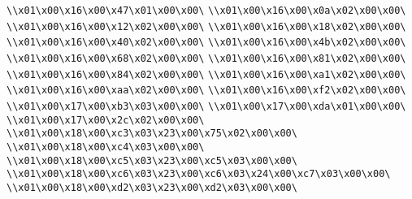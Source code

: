\verb|\\x01\x00\x16\x00\x47\x01\x00\x00\|\newline
\verb|\\x01\x00\x16\x00\x0a\x02\x00\x00\|\newline
\verb|\\x01\x00\x16\x00\x12\x02\x00\x00\|\newline
\verb|\\x01\x00\x16\x00\x18\x02\x00\x00\|\newline
\verb|\\x01\x00\x16\x00\x40\x02\x00\x00\|\newline
\verb|\\x01\x00\x16\x00\x4b\x02\x00\x00\|\newline
\verb|\\x01\x00\x16\x00\x68\x02\x00\x00\|\newline
\verb|\\x01\x00\x16\x00\x81\x02\x00\x00\|\newline
\verb|\\x01\x00\x16\x00\x84\x02\x00\x00\|\newline
\verb|\\x01\x00\x16\x00\xa1\x02\x00\x00\|\newline
\verb|\\x01\x00\x16\x00\xaa\x02\x00\x00\|\newline
\verb|\\x01\x00\x16\x00\xf2\x02\x00\x00\|\newline
\verb|\\x01\x00\x17\x00\xb3\x03\x00\x00\|\newline
\verb|\\x01\x00\x17\x00\xda\x01\x00\x00\|\newline
\verb|\\x01\x00\x17\x00\x2c\x02\x00\x00\|\newline
\verb|\\x01\x00\x18\x00\xc3\x03\x23\x00\x75\x02\x00\x00\|\newline
\verb|\\x01\x00\x18\x00\xc4\x03\x00\x00\|\newline
\verb|\\x01\x00\x18\x00\xc5\x03\x23\x00\xc5\x03\x00\x00\|\newline
\verb|\\x01\x00\x18\x00\xc6\x03\x23\x00\xc6\x03\x24\x00\xc7\x03\x00\x00\|\newline
\verb|\\x01\x00\x18\x00\xd2\x03\x23\x00\xd2\x03\x00\x00\|\newline
